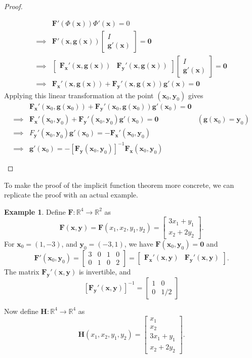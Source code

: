 \documentclass{article}
\newcommand{\R}{\mathbb{R}}
\newcommand{\x}{\mathbf{x}}
\newcommand{\F}{\mathbf{F}}
\newcommand{\y}{\mathbf{y}}
\newcommand{\g}{\mathbf{g}}
\newcommand{\ze}{\mathbf{0}}
\theoremstyle{definition}
\newtheorem{example}{Example}[section]
\begin{document}
\begin{proof}
\begin{enumerate}
\begin{enumerate}
\begin{align*}
&		\F'(\Phi(\x))\Phi'(\x)=0\\
\implies & 	\F'(\x, \g(\x))\begin{bmatrix}
	I \\ \g'(\x)
\end{bmatrix} = \ze\\
\implies & 	\begin{bmatrix}
	\F_\x'(\x,\g(\x)) & 	\F_\y'(\x,\g(\x))
\end{bmatrix}\begin{bmatrix}
	I \\ \g'(\x)
\end{bmatrix} = \ze\\ 
\implies & \F_\x'(\x,\g(\x)) + \F_\y'(\x,\g(\x))\g'(\x) = \ze 
	\end{align*}
Applying this linear transformation  at the point $ (\x_0,\y_0) $ gives 
\begin{align*}
	 &\F_\x'(\x_0,\g(\x_0)) + \F_\y'(\x_0,\g(\x_0))\g'(\x_0) = \ze \\
	 \implies & \F_\x'(\x_0,\y_0) + \F_\y'(\x_0,\y_0)\g'(\x_0) = \ze & (\g(\x_0) = \y_0) \\ 
	 \implies & F_\y'(\x_0,\y_0)\g'(\x_0) = -\F_\x'(\x_0,\y_0)  \\
	 \implies & \g'(\x_0)=-[\mathbf F_\y(\x_0,\y_0)]^{-1}\mathbf F_\x(\x_0,\y_0)
\end{align*}
\end{enumerate}
\end{enumerate}
\end{proof}
To make the proof of the implicit function theorem more concrete, we can replicate the proof with an actual example.
\begin{example}
	Define $ \F:\R^4\to\R^2 $ as 
	$$ \F(\x,\y) = \F(x_1,x_2,y_1,y_2) = \begin{bmatrix}
		3x_1 + y_1\\
		x_2 + 2y_2
	\end{bmatrix}.$$
For $ \x_0 = (1,-3) $, and $ \y_0 = (-3,1) $, we have $ \F(\x_0,\y_0)=\ze $ and 
$$ \F'(\x_0,\y_0) =\left[
\begin{array}{cc|cc}
	3&0&1&0\\
	0&1&0&2
\end{array}\right] = \begin{bmatrix}
\mathbf F_\x'(\x,\y) & \mathbf F_\y'(\x,\y) 
\end{bmatrix}.$$
The matrix  $\mathbf F_\y'(\x,\y) $ is invertible, and 
$$[\mathbf F_\y'(\x,\y)]^{-1}  = \begin{bmatrix}
	1 & 0\\0 &1/2
\end{bmatrix}$$

Now define $ \mathbf H:\R^4\to\R^4 $ as 
$$ \mathbf H(x_1,x_2,y_1,y_2) = \begin{bmatrix}
	x_1\\
	x_2\\
	3x_1 + y_1\\
	x_2 + 2y_2
\end{bmatrix}.$$
\end{example}
\end{document}
